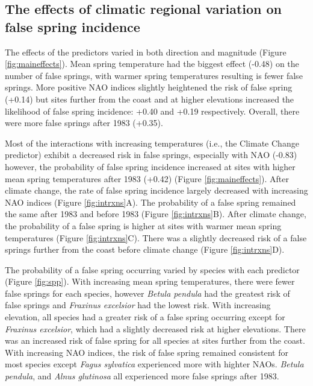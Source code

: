 \documentclass{article}\usepackage[]{graphicx}\usepackage[]{color}
\begin{document}
\subsection*{The effects of climatic regional variation on false spring incidence}
The effects of the predictors varied in both direction and magnitude (Figure \ref{fig:maineffects}). Mean spring temperature had the biggest effect (-0.48) on the number of false springs, with warmer spring temperatures resulting is fewer false springs. More positive NAO indices slightly heightened the risk of false spring (+0.14) but sites further from the coast and at higher elevations increased the likelihood of false spring incidence: +0.40 and +0.19 respectively. Overall, there were more false springs after 1983 (+0.35). 

Most of the interactions with increasing temperatures (i.e., the Climate Change predictor) exhibit a decreased risk in false springs, especially with NAO (-0.83) however, the probability of false spring incidence increased at sites with higher mean spring temperatures after 1983 (+0.42) (Figure \ref{fig:maineffects}). After climate change, the rate of false spring incidence largely decreased with increasing NAO indices (Figure \ref{fig:intrxns}A). The probability of a false spring remained the same after 1983 and before 1983 (Figure \ref{fig:intrxns}B). After climate change, the probability of a false spring is higher at sites with warmer mean spring temperatures (Figure \ref{fig:intrxns}C). There was a slightly decreased risk of a false springs further from the coast before climate change (Figure \ref{fig:intrxns}D).

The probability of a false spring occurring varied by species with each predictor (Figure \ref{fig:spp}). With increasing mean spring temperatures, there were fewer false springs for each species, however \textit{Betula pendula} had the greatest risk of false springs and \textit{Fraxinus excelsior} had the lowest risk. With increasing elevation, all species had a greater risk of a false spring occurring except for \textit{Fraxinus excelsior}, which had a slightly decreased risk at higher elevations. There was an increased risk of false spring for all species at sites further from the coast. With increasing NAO indices, the risk of false spring remained consistent for most species except \textit{Fagus sylvatica} experienced more with highter NAOs. \textit{Betula pendula},  and \textit{Alnus glutinosa} all experienced more false springs after 1983.
\end{document}
